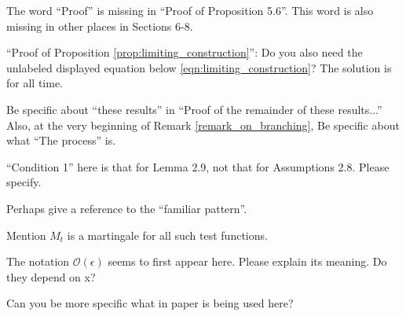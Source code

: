 
\begin{point}{\revref}
The word ``Proof'' is missing in ``Proof of Proposition 5.6''. This word is also
missing in other places in Sections 6-8.
\end{point}

\reply{
}

\begin{point}{}
``Proof of Proposition \ref{prop:limiting_construction}'': Do you also need the unlabeled displayed equation below
\eqref{eqn:limiting_construction}? The solution is for all time.
\end{point}

\reply{
}

\begin{point}{\revref}
Be specific about ``these results'' in ``Proof of the remainder of these results...'' Also, at the
very beginning of Remark \ref{remark_on_branching}, Be specific about what ``The process'' is.
\end{point}

\reply{
}

\begin{point}{\revref}
``Condition 1'' here is that for Lemma 2.9, not that for Assumptions 2.8. Please specify.
\end{point}

\reply{
}

\begin{point}{\revref}
Perhaps give a reference to the ``familiar pattern''.
\end{point}


\begin{point}{\revref}
Mention $M_t$ is a martingale for all such test functions.
\end{point}


\begin{point}{\revref}
    The notation $\mathcal{O}(\epsilon)$ seems to first appear here. Please explain its meaning. Do they
depend on x?
\end{point}


\begin{point}{\revref}
    Can you be more specific what in paper \citet{barlow/jacka/yor:1986} is being used here?
\end{point}

